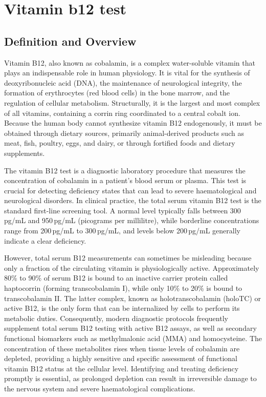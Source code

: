 \chapter{Vitamin b12 test}

\section*{Definition and Overview}
Vitamin B12, also known as cobalamin, is a complex water-soluble vitamin that plays an indispensable role in human physiology. It is vital for the synthesis of deoxyribonucleic acid (DNA), the maintenance of neurological integrity, the formation of erythrocytes (red blood cells) in the bone marrow, and the regulation of cellular metabolism. Structurally, it is the largest and most complex of all vitamins, containing a corrin ring coordinated to a central cobalt ion. Because the human body cannot synthesize vitamin B12 endogenously, it must be obtained through dietary sources, primarily animal-derived products such as meat, fish, poultry, eggs, and dairy, or through fortified foods and dietary supplements.

The vitamin B12 test is a diagnostic laboratory procedure that measures the concentration of cobalamin in a patient's blood serum or plasma. This test is crucial for detecting deficiency states that can lead to severe haematological and neurological disorders. In clinical practice, the total serum vitamin B12 test is the standard first-line screening tool. A normal level typically falls between 300\,pg/mL and 950\,pg/mL (picograms per millilitre), while borderline concentrations range from 200\,pg/mL to 300\,pg/mL, and levels below 200\,pg/mL generally indicate a clear deficiency.

However, total serum B12 measurements can sometimes be misleading because only a fraction of the circulating vitamin is physiologically active. Approximately 80\% to 90\% of serum B12 is bound to an inactive carrier protein called haptocorrin (forming transcobalamin I), while only 10\% to 20\% is bound to transcobalamin II. The latter complex, known as holotranscobalamin (holoTC) or active B12, is the only form that can be internalized by cells to perform its metabolic duties. Consequently, modern diagnostic protocols frequently supplement total serum B12 testing with active B12 assays, as well as secondary functional biomarkers such as methylmalonic acid (MMA) and homocysteine. The concentration of these metabolites rises when tissue levels of cobalamin are depleted, providing a highly sensitive and specific assessment of functional vitamin B12 status at the cellular level. Identifying and treating deficiency promptly is essential, as prolonged depletion can result in irreversible damage to the nervous system and severe haematological complications.

